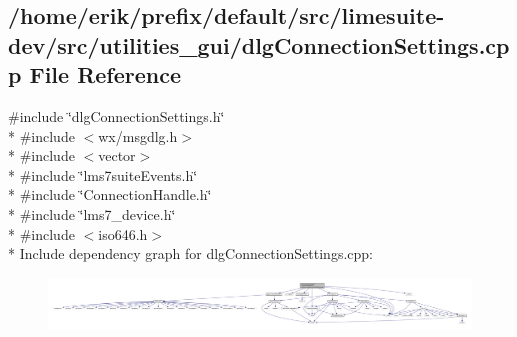 \subsection{/home/erik/prefix/default/src/limesuite-\/dev/src/utilities\+\_\+gui/dlg\+Connection\+Settings.cpp File Reference}
\label{dlgConnectionSettings_8cpp}
{\ttfamily \#include \char`\"{}dlg\+Connection\+Settings.\+h\char`\"{}}\\*
{\ttfamily \#include $<$wx/msgdlg.\+h$>$}\\*
{\ttfamily \#include $<$vector$>$}\\*
{\ttfamily \#include \char`\"{}lms7suite\+Events.\+h\char`\"{}}\\*
{\ttfamily \#include \char`\"{}Connection\+Handle.\+h\char`\"{}}\\*
{\ttfamily \#include \char`\"{}lms7\+\_\+device.\+h\char`\"{}}\\*
{\ttfamily \#include $<$iso646.\+h$>$}\\*
Include dependency graph for dlg\+Connection\+Settings.\+cpp\+:
\nopagebreak
\begin{figure}[H]
\begin{center}
\leavevmode
\includegraphics[width=350pt]{df/dfa/dlgConnectionSettings_8cpp__incl}
\end{center}
\end{figure}
